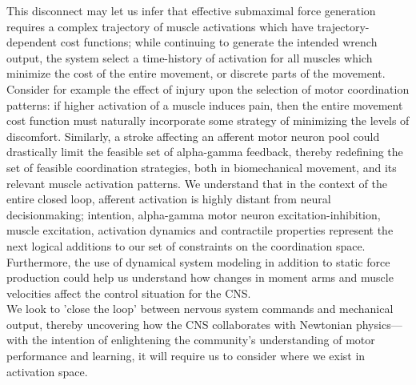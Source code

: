 This disconnect may let us infer that effective submaximal force generation requires a complex trajectory of muscle activations which have trajectory-dependent cost functions; while continuing to generate the intended wrench output, the system select a time-history of activation for all muscles which minimize the cost of the entire movement, or discrete parts of the movement.
Consider for example the effect of injury upon the selection of motor coordination patterns: if higher activation of a muscle induces pain, then the entire movement cost function must naturally incorporate some strategy of minimizing the levels of discomfort. Similarly, a stroke affecting an afferent motor neuron pool could drastically limit the feasible set of alpha-gamma feedback, thereby redefining the set of feasible coordination strategies, both in biomechanical movement, and its relevant muscle activation patterns.
We understand that in the context of the entire closed loop, afferent activation is highly distant from neural decisionmaking;  intention, alpha-gamma motor neuron excitation-inhibition, muscle excitation, activation dynamics and contractile properties represent the next logical additions to our set of constraints on the coordination space. Furthermore, the use of dynamical system modeling in addition to static force production could help us understand how changes in moment arms and muscle velocities affect the control situation for the CNS.\\

We look to 'close the loop' between nervous system commands and mechanical output, thereby uncovering how the CNS collaborates with Newtonian physics--- with the intention of enlightening the community's understanding of motor performance and learning, it will require us to consider where we exist in activation space.